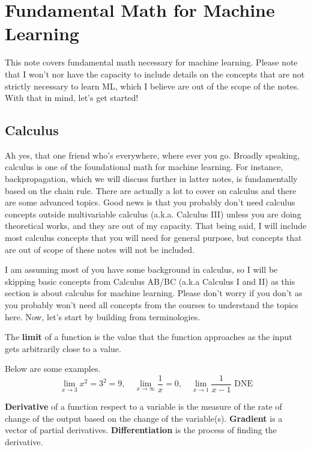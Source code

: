 \documentclass[../../../main.tex]{subfiles}
\begin{document}
\chapter{Fundamental Math for Machine Learning}

This note covers fundamental math necessary for machine learning.
Please note that I won't nor have the capacity to include details
on the concepts that are not strictly necessary to learn ML,
which I believe are out of the scope of the notes. With that
in mind, let's get started!

\section{Calculus}

Ah yes, that one friend who's everywhere, where ever you go.
Broadly speaking, calculus is one of the foundational math
for machine learning. For instance, backpropagation, which
we will discuss further in latter notes, is fundamentally
based on the chain rule. There are actually a lot to cover on
calculus and there are some advanced topics. Good news is that
you probably don't need calculus concepts outside multivariable
calculus (a.k.a. Calculus III) unless you are doing theoretical
works, and they are out of my capacity. That being said, I will
include most calculus concepts that you will need for general
purpose, but concepts that are out of scope of these notes will
not be included.

I am assuming most of you have some background in calculus, so I will
be skipping basic concepts from Calculus AB/BC (a.k.a Calculus I and
II) as this section is about calculus for machine learning.
Please don't worry if you don't as you probably won't need all
concepts from the courses to understand the topics here. Now, let's
start by building from terminologies.

\begin{definition}{}{}
The \textbf{limit} of a function is the value that the function
approaches as the input gets arbitrarily close to a value.
\end{definition}

Below are some examples.
\[
\lim_{x \to 3} x^2 = 3^2 = 9,
\quad
\lim_{x \to \infty} \frac{1}{x} = 0,
\quad
\lim_{x \to 1} \frac{1}{x - 1} \text{ DNE}
\]

\begin{definition}{}{}
\textbf{Derivative} of a function respect to a variable is the
measure of the rate of change of the output based on the change of
the variable(s). \textbf{Gradient} is a vector of partial derivatives.
\textbf{Differentiation} is the process of finding the derivative.
\end{definition}
\end{document}
